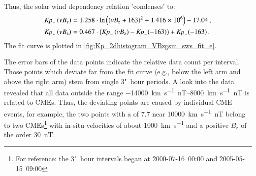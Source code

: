 Thus, the solar wind dependency relation 'condenses' to:
\begin{align}
	\text{\textit{Kp}}_-\left(vB_\text{z}\right) &= 1.258 \cdot \ln\left(\left(vB_\text{z} + 163\right)^2 + \num{1.416e6}\right) - 17.04	\,,	\label{eq:kpvsvbz_dependency_function_negative}\\
	\text{\textit{Kp}}_+\left(vB_\text{z}\right) &= 0.467 \cdot \left(\text{\textit{Kp}}_-\left(vB_\text{z}\right) - \text{\textit{Kp}}_-(-163)\right) + \text{\textit{Kp}}_-(-163)	\,.	\label{eq:kpvsvbz_dependency_function_positive}
\end{align}
The fit curve is plotted in \autoref{fig:Kp_2dhistogram_VBzgsm_sws_fit_e}.
\begin{figure}
\end{figure}
The error bars of the data points indicate the relative data count per \vBz{} interval. Those points which deviate far from the fit curve (e.g., below the left arm and above the right arm) stem from single 3"~hour periods. A look into the data revealed that all data outside the range \SIrange{-14000}{8000}{\km\per\s\nano\tesla} is related to CMEs. Thus, the deviating points are caused by individual CME events, for example, the two points with a \Kp{} of $7.7$ near \SI{10000}{\km\per\s\nano\tesla} belong to two CMEs\footnote{For reference: the 3"~hour intervals began at 2000-07-16~00:00 and 2005-05-15~09:00} with in-situ velocities of about \SI{1000}{\km\per\s} and a positive $B_\text{z}$ of the order \SI{30}{\nano\tesla}.

